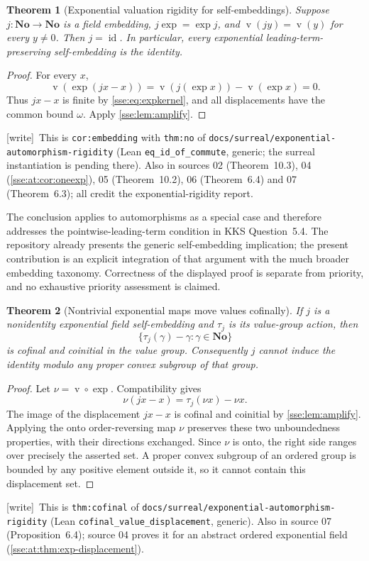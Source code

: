 \documentclass[11pt,a4paper]{article}
\numberwithin{equation}{section}
\theoremstyle{plain}
\newtheorem{theorem}{Theorem}[section]
\theoremstyle{definition}
\theoremstyle{remark}
\newcommand{\No}{\mathbf{No}}
\newcommand{\id}{\operatorname{id}}
\newcommand{\val}{\operatorname{v}}
\newcommand{\code}[1]{\texttt{\small #1}}
\newcommand{\lbl}[1]{\nolinkurl{#1}}%
\newcommand{\fn}[1]{\nolinkurl{#1}}%
\newcommand{\wtag}{\textup{\textsf{[write]}}}%
\newenvironment{wnote}{\par\smallskip\noindent\wtag\ }{\par\smallskip}
\begin{document}
\begin{theorem}[Exponential valuation rigidity for self-embeddings]
\label{sse:thm:exprigidity}
Suppose $j:\No\to\No$ is a field embedding, $j\exp=\exp j$, and
$\val(jy)=\val(y)$ for every $y\ne0$. Then $j=\id$.
In particular, every exponential leading-term-preserving self-embedding
is the identity.
\end{theorem}
\begin{proof}
For every $x$,
\[
 \val(\exp(jx-x))
 =\val(j(\exp x))-\val(\exp x)=0.
\]
Thus $jx-x$ is finite by \eqref{sse:eq:expkernel}, and all displacements have
the common bound $\omega$. Apply \cref{sse:lem:amplify}.
\end{proof}
\begin{wnote}This is \lbl{cor:embedding} with \lbl{thm:no} of \fn{docs/surreal/exponential-automorphism-rigidity} (Lean \code{eq\_id\_of\_commute}, generic; the surreal instantiation is pending there). Also in sources 02 (Theorem~10.3), 04 (\cref{sse:at:cor:oneexp}), 05 (Theorem~10.2), 06 (Theorem~6.4) and 07 (Theorem~6.3); all credit the exponential-rigidity report.\end{wnote}
The conclusion applies to automorphisms as a special case and therefore
addresses the pointwise-leading-term condition in KKS Question~5.4.
The repository already presents the generic self-embedding implication;
the present contribution is an explicit integration of that argument
with the much broader embedding taxonomy. Correctness of the displayed
proof is separate from priority, and no exhaustive priority assessment
is claimed.

\begin{theorem}[Nontrivial exponential maps move values cofinally]
\label{sse:thm:expvalue}
If $j$ is a nonidentity exponential field self-embedding and $\tau_j$ is
its value-group action, then
\[
 \{\tau_j(\gamma)-\gamma:\gamma\in\No\}
\]
is cofinal and coinitial in the value group. Consequently $j$ cannot
induce the identity modulo any proper convex subgroup of that group.
\end{theorem}
\begin{proof}
Let $\nu=\val\circ\exp$. Compatibility gives
\begin{equation}\label{sse:eq:profileintertwine}
 \nu(jx-x)=\tau_j(\nu x)-\nu x.
\end{equation}
The image of the displacement $jx-x$ is cofinal and coinitial by
\cref{sse:lem:amplify}. Applying the onto order-reversing map $\nu$ preserves
these two unboundedness properties, with their directions exchanged.
Since $\nu$ is onto, the right side ranges over precisely the asserted
set. A proper convex subgroup of an ordered group is bounded by any
positive element outside it, so it cannot contain this displacement set.
\end{proof}
\begin{wnote}This is \lbl{thm:cofinal} of \fn{docs/surreal/exponential-automorphism-rigidity} (Lean \code{cofinal\_value\_displacement}, generic). Also in source 07 (Proposition~6.4); source 04 proves it for an abstract ordered exponential field (\cref{sse:at:thm:exp-displacement}).\end{wnote}
\end{document}
